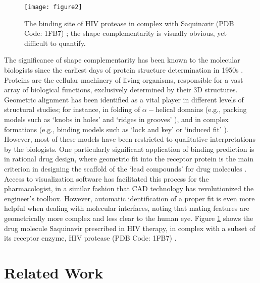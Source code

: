 \documentclass[article]{gmp2014}
\theoremstyle{definition}
\begin{document}
%
\begin{figure}
    \centering
    \texttt{[image: figure2]}
    \caption{The binding site of HIV protease in complex with Saquinavir (PDB Code: 1FB7) \cite{Hong2000}; the shape complementarity is visually obvious, yet difficult to quantify.} \label{figure2}
\end{figure}
%

The significance of shape complementarity has been known to the molecular biologists since the earliest days of protein structure determination in 1950s \cite{Kendrew1958}. Proteins are the cellular machinery of living organisms, responsible for a vast array of biological functions, exclusively determined by their 3D structures. Geometric alignment has been identified as a vital player in different levels of structural studies; for instance, in folding of $\alpha-$helical domains (e.g., packing models such as `knobs in holes' and `ridges in grooves' \cite{Eilers2002}), and in complex formations (e.g., binding models such as `lock and key' or `induced fit' \cite{Koshland1995}). However, most of these models have been restricted to qualitative interpretations by the biologists.
%
One particularly significant application of binding prediction is in rational drug design, where geometric fit into the receptor protein is the main criterion in designing the scaffold of the `lead compounds' for drug molecules \cite{Kuriyan2012}.
%
Access to visualization software has facilitated this process for the pharmacologist, in a similar fashion that CAD technology has revolutionized the engineer's toolbox. However, automatic identification of a proper fit is even more helpful when dealing with molecular interfaces, noting that mating features are geometrically more complex and less clear to the human eye. Figure \ref{figure2} shows the drug molecule Saquinavir prescribed in HIV therapy, in complex with a subset of its receptor enzyme, HIV protease (PDB Code: 1FB7) \cite{Hong2000}.


\section{Related Work} \label{sec_relatedwork}
\end{document}
